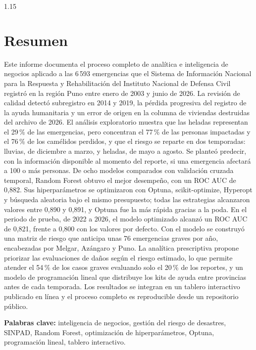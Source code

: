 \documentclass[12pt,a4paper]{article}
\begin{document}
\setcounter{page}{2}
\begin{spacing}{1.15}
\section*{Resumen}
\noindent Este informe documenta el proceso completo de analítica e inteligencia de negocios aplicado a las 6\,593
emergencias que el Sistema de Información Nacional para la Respuesta y Rehabilitación del Instituto Nacional de
Defensa Civil registró en la región Puno entre enero de 2003 y junio de 2026. La revisión de calidad detectó
subregistro en 2014 y 2019, la pérdida progresiva del registro de la ayuda humanitaria y un error de origen en la
columna de viviendas destruidas del archivo de 2026. El análisis exploratorio muestra que las heladas representan
el 29\,\% de las emergencias, pero concentran el 77\,\% de las personas impactadas y el 76\,\% de los camélidos
perdidos, y que el riesgo se reparte en dos temporadas: lluvias, de diciembre a marzo, y heladas, de mayo a agosto.
Se planteó predecir, con la información disponible al momento del reporte, si una emergencia afectará a 100 o más
personas. De ocho modelos comparados con validación cruzada temporal, Random Forest obtuvo el mejor desempeño,
con un ROC AUC de 0,882. Sus hiperparámetros se optimizaron con Optuna, scikit-optimize, Hyperopt y búsqueda
aleatoria bajo el mismo presupuesto; todas las estrategias alcanzaron valores entre 0,890 y 0,891, y Optuna fue la
más rápida gracias a la poda. En el periodo de prueba, de 2022 a 2026, el modelo optimizado alcanzó un ROC AUC de
0,821, frente a 0,800 con los valores por defecto. Con el modelo se construyó una matriz de riesgo que anticipa
unas 76 emergencias graves por año, encabezadas por Melgar, Azángaro y Puno. La analítica prescriptiva propone
priorizar las evaluaciones de daños según el riesgo estimado, lo que permite atender el 54\,\% de los casos graves
evaluando solo el 20\,\% de los reportes, y un modelo de programación lineal que distribuye los kits de ayuda entre
provincias antes de cada temporada. Los resultados se integran en un tablero interactivo publicado en línea y el
proceso completo es reproducible desde un repositorio público.

\medskip\noindent\textbf{Palabras clave:} inteligencia de negocios, gestión del riesgo de desastres, SINPAD,
Random Forest, optimización de hiperparámetros, Optuna, programación lineal, tablero interactivo.


\end{spacing}
\end{document}
